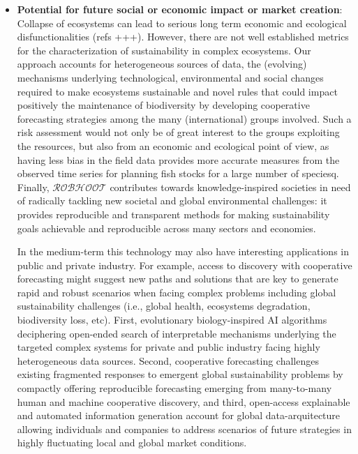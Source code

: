 \documentclass[11pt, a4paper]{article} %
\begin{document}
\begin{itemize}
\item {\bf Potential for future social or economic impact or market creation}:\\
  Collapse of ecosystems can lead to serious long term economic and
  ecological disfunctionalities (refs +++). However, there are not
  well established metrics for the characterization of sustainability
  in complex ecosystems. Our approach accounts for heterogeneous
  sources of data, the (evolving) mechanisms underlying technological,
  environmental and social changes required to make ecosystems
  sustainable and novel rules that could impact positively the
  maintenance of biodiversity by developing cooperative forecasting
  strategies among the many (international) groups involved. Such a
  risk assessment would not only be of great interest to the groups
  exploiting the resources, but also from an economic and ecological
  point of view, as having less bias in the field data provides more
  accurate measures from the observed time series for planning fish
  stocks for a large number of speciesq. Finally, $\mathcal{ROBHOOT}$
  contributes towards knowledge-inspired societies in need of
  radically tackling new societal and global environmental challenges:
  it provides reproducible and transparent methods for making
  sustainability goals achievable and reproducible across many sectors
  and economies.

  In the medium-term this technology may also have interesting
  applications in public and private industry. For example, access to
  discovery with cooperative forecasting might suggest new paths and
  solutions that are key to generate rapid and robust scenarios when
  facing complex problems including global sustainability challenges
  (i.e., global health, ecosystems degradation, biodiversity loss,
  etc). First, evolutionary biology-inspired AI algorithms deciphering
  open-ended search of interpretable mechanisms underlying the
  targeted complex systems for private and public industry facing
  highly heterogeneous data sources. Second, cooperative forecasting
  challenges existing fragmented responses to emergent global
  sustainability problems by compactly offering reproducible
  forecasting emerging from many-to-many human and machine cooperative
  discovery, and third, open-access explainable and automated
  information generation account for global data-arquitecture allowing
  individuals and companies to address scenarios of future strategies
  in highly fluctuating local and global market conditions.


\end{itemize}
\end{document}
